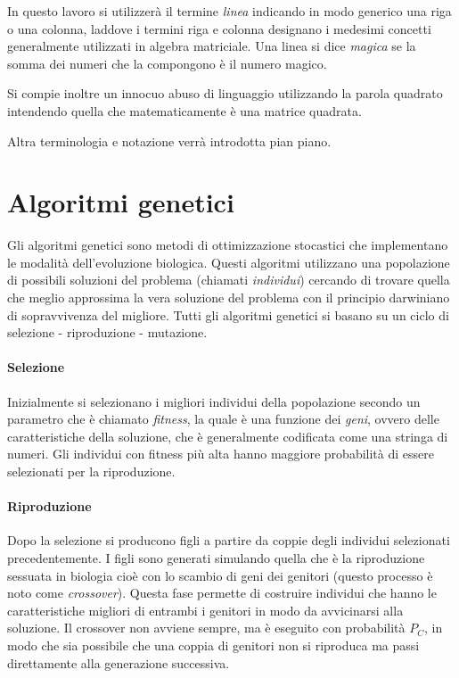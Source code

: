 \documentclass[italian,twoside,twocolumn]{article}
\begin{document}
In questo lavoro si utilizzerà il termine \emph{linea} indicando in modo generico una riga o una colonna, laddove i termini riga e colonna designano i medesimi concetti generalmente utilizzati in algebra matriciale. Una linea si dice \emph{magica} se la somma dei numeri che la compongono è il numero magico. 

Si compie inoltre un innocuo abuso di linguaggio utilizzando la parola quadrato intendendo quella che matematicamente è una matrice quadrata.

Altra terminologia e notazione verrà introdotta pian piano.

\section{Algoritmi genetici}
Gli algoritmi genetici sono metodi di ottimizzazione stocastici che implementano le modalità dell'evoluzione biologica. Questi algoritmi utilizzano una popolazione di possibili soluzioni del problema (chiamati \emph{individui}) cercando di trovare quella che meglio approssima la vera soluzione del problema con il principio darwiniano di sopravvivenza del migliore. Tutti gli algoritmi genetici si basano su un ciclo di selezione - riproduzione - mutazione.
\paragraph{Selezione} Inizialmente si selezionano i migliori individui della popolazione secondo un parametro che è chiamato \emph{fitness}, la quale è una funzione dei \emph{geni}, ovvero delle caratteristiche della soluzione, che è generalmente codificata come una stringa di numeri. Gli individui con fitness più alta hanno maggiore probabilità di essere selezionati per la riproduzione.

\paragraph{Riproduzione} Dopo la selezione si producono figli a partire da coppie degli individui selezionati precedentemente. I figli sono generati simulando quella che è la riproduzione sessuata in biologia cioè con lo scambio di geni dei genitori (questo processo è noto come \emph{crossover}). Questa fase permette di costruire individui che hanno le caratteristiche migliori di entrambi i genitori in modo da avvicinarsi alla soluzione. Il crossover non avviene sempre, ma è eseguito con probabilità $ P_C $, in modo che sia possibile che una coppia di genitori non si riproduca ma passi direttamente alla generazione successiva.  
\end{document}

